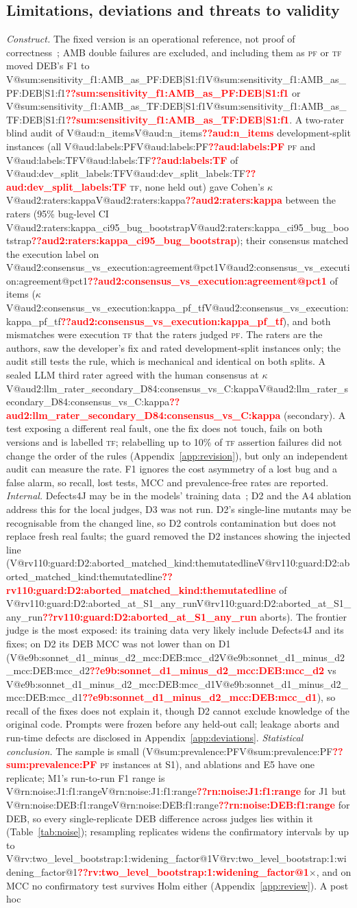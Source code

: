 \documentclass[pdflatex,iicol,sn-mathphys-num]{sn-jnl}
\makeatletter
\newcommand{\V}[1]{\ifcsname V@#1\endcsname\csname V@#1\endcsname\else\textbf{\textcolor{red}{??#1}}\fi}
\newcommand{\PF}{\textsc{pf}}
\newcommand{\TF}{\textsc{tf}}
\makeatother
\begin{document}
\subsection{Limitations, deviations and threats to validity}
\textit{Construct.} The fixed version is an operational reference, not proof of correctness~\cite{zhao2026misguidance}; AMB double failures are excluded, and including them as \PF{} or \TF{} moved DEB's F1 to \V{sum:sensitivity_f1:AMB_as_PF:DEB|S1:f1} or \V{sum:sensitivity_f1:AMB_as_TF:DEB|S1:f1}. A two-rater blind audit of \V{aud:n_items} development-split instances (all \V{aud:labels:PF} \PF{} and \V{aud:labels:TF} of \V{aud:dev_split_labels:TF} \TF{}, none held out) gave Cohen's $\kappa$~\cite{cohen1960kappa} \V{aud2:raters:kappa} between the raters (95\% bug-level CI \V{aud2:raters:kappa_ci95_bug_bootstrap}); their consensus matched the execution label on \V{aud2:consensus_vs_execution:agreement@pct1} of items ($\kappa$ \V{aud2:consensus_vs_execution:kappa_pf_tf}), and both mismatches were execution \TF{} that the raters judged \PF{}. The raters are the authors, saw the developer's fix and rated development-split instances only; the audit still tests the rule, which is mechanical and identical on both splits. A sealed LLM third rater agreed with the human consensus at $\kappa$ \V{aud2:llm_rater_secondary_D84:consensus_vs_C:kappa} (secondary). A test exposing a different real fault, one the fix does not touch, fails on both versions and is labelled \TF{}; relabelling up to 10\% of \TF{} assertion failures did not change the order of the rules (Appendix~\ref{app:revision}), but only an independent audit can measure the rate. F1 ignores the cost asymmetry of a lost bug and a false alarm, so recall, lost tests, MCC and prevalence-free rates are reported. \textit{Internal.} Defects4J may be in the models' training data~\cite{huang2026ult}; D2 and the A4 ablation address this for the local judges, D3 was not run. D2's single-line mutants may be recognisable from the changed line, so D2 controls contamination but does not replace fresh real faults; the guard removed the D2 instances showing the injected line (\V{rv110:guard:D2:aborted_matched_kind:themutatedline} of \V{rv110:guard:D2:aborted_at_S1_any_run} aborts). The frontier judge is the most exposed: its training data very likely include Defects4J and its fixes; on D2 its DEB MCC was not lower than on D1 (\V{e9b:sonnet_d1_minus_d2_mcc:DEB:mcc_d2} vs \V{e9b:sonnet_d1_minus_d2_mcc:DEB:mcc_d1}), so recall of the fixes does not explain it, though D2 cannot exclude knowledge of the original code. Prompts were frozen before any held-out call; leakage aborts and run-time defects are disclosed in Appendix~\ref{app:deviations}. \textit{Statistical conclusion.} The sample is small (\V{sum:prevalence:PF} \PF{} instances at S1), and ablations and E5 have one replicate; M1's run-to-run F1 range is \V{rn:noise:J1:f1:range} for J1 but \V{rn:noise:DEB:f1:range} for DEB, so every single-replicate DEB difference across judges lies within it (Table~\ref{tab:noise}); resampling replicates widens the confirmatory intervals by up to \V{rv:two_level_bootstrap:1:widening_factor@1}$\times$, and on MCC no confirmatory test survives Holm either (Appendix~\ref{app:review}). A post hoc 
\end{document}
